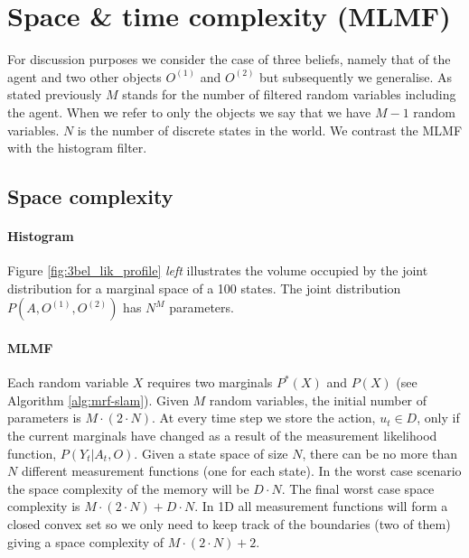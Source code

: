 \documentclass[review]{elsarticle}
\numberwithin{equation}{section}
\begin{document}
\section{Space \& time complexity (MLMF)}

For discussion purposes we consider the case of three beliefs, namely that of the agent and two other objects $O^{(1)}$ and $O^{(2)}$ but 
subsequently we generalise. As stated previously $M$ stands for the number of filtered random variables including the agent. When we refer 
to only the objects we say that we have $M-1$ random variables. $N$ is the number of discrete states in the world. We contrast
the MLMF with the histogram filter.

\subsection{Space complexity}

\paragraph{Histogram}

Figure \ref{fig:3bel_lik_profile} \textit{left} illustrates the volume occupied by the joint distribution for a marginal space of a 
100 states. The joint distribution $P(A,O^{(1)},O^{(2)})$ has $N^{M}$ parameters. 

\paragraph{MLMF}

Each random variable $X$ requires two marginals $P^{*}(X)$ and $P(X)$ (see Algorithm \ref{alg:mrf-slam}). Given
$M$ random variables, the initial number of parameters is $M \cdot (2 \cdot N)$. At every time step we store 
the action, $u_t \in D$, only if the current marginals have changed as a result of the measurement likelihood function, $P(Y_t|A_t,O)$.
Given a state space of size $N$, there can be no more than $N$ different measurement functions (one for each state). In
the worst case scenario the space complexity of the memory will be $D\cdot N$. The final worst case space complexity is
$M \cdot (2 \cdot N) + D \cdot N$. In 1D all measurement functions will form a closed convex set so we only need to 
keep track of the boundaries (two of them) giving a space complexity of  $M \cdot (2 \cdot N) + 2$.
\end{document}
